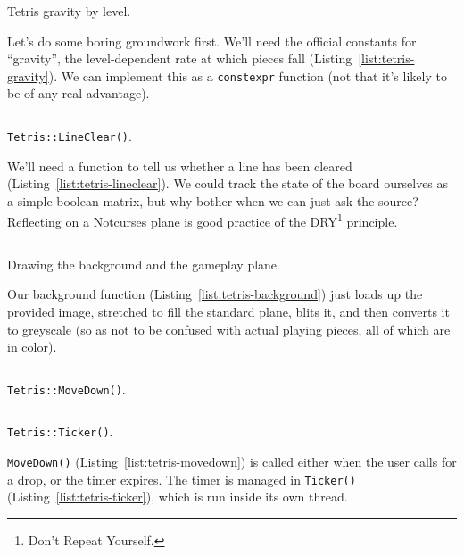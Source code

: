 \pagebreak

\begin{listing}[!htb]
\inputminted[]{C}{code-tetris/gravity.h}
\caption{Tetris gravity by level.}
\label{list:tetris-gravity}
\end{listing}

Let's do some boring groundwork first. We'll need the official constants for
``gravity'', the level-dependent rate at which pieces fall
(Listing~\ref{list:tetris-gravity}). We can implement this as a
\texttt{constexpr} function (not that it's likely to be of any real advantage).

\begin{listing}[!htb]
\inputminted[]{C}{code-tetris/clear.h}
\caption{\texttt{Tetris::LineClear()}.}
\label{list:tetris-lineclear}
\end{listing}

We'll need a function to tell us whether a line has been cleared
(Listing~\ref{list:tetris-lineclear}). We could track the state of the board
ourselves as a simple boolean matrix, but why bother when we can just ask the
source? Reflecting on a Notcurses plane is good practice of the
DRY\footnote{Don't Repeat Yourself.} principle.

\pagebreak

\begin{listing}[!htb]
\inputminted[]{C}{code-tetris/background.h}
\caption{Drawing the background and the gameplay plane.}
\label{list:tetris-background}
\end{listing}

Our background function (Listing~\ref{list:tetris-background}) just loads up
the provided image, stretched to fill the standard plane, blits it, and then
converts it to greyscale (so as not to be confused with actual playing pieces,
all of which are in color).

\begin{listing}[!htb]
\inputminted[]{C}{code-tetris/movedown.h}
\caption{\texttt{Tetris::MoveDown()}.}
\label{list:tetris-movedown}
\end{listing}

\begin{listing}[!htb]
\inputminted[]{C}{code-tetris/ticker.h}
\caption{\texttt{Tetris::Ticker()}.}
\label{list:tetris-ticker}
\end{listing}

\texttt{MoveDown()} (Listing~\ref{list:tetris-movedown}) is called either when
the user calls for a drop, or the timer expires. The timer is managed in
\texttt{Ticker()} (Listing~\ref{list:tetris-ticker}), which is run inside its
own thread.

